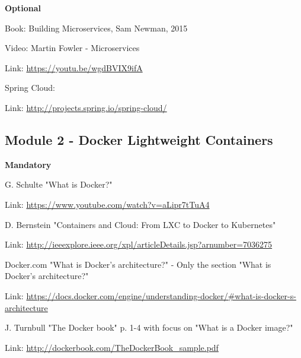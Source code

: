 \noindent\textbf{Optional}
\begin{compactitem}	
\setlength\itemsep{0.05em}
  \item Book: Building Microservices, Sam Newman, 2015

  \item Video: Martin Fowler - Microservices
  \begin{compactitem}
  	\item Link: \url{https://youtu.be/wgdBVIX9ifA}
  \end{compactitem}
 
  \item Spring Cloud:
  \begin{compactitem}
  	\item Link: \url{http://projects.spring.io/spring-cloud/}
  \end{compactitem}
\end{compactitem}


\subsection*{Module 2 - Docker Lightweight Containers}

\textbf{Mandatory}
\begin{compactitem}	
\setlength\itemsep{0.05em}
  \item G. Schulte "What is Docker?"
  \begin{compactitem}
  	\item Link: \url{https://www.youtube.com/watch?v=aLipr7tTuA4 } 
  \end{compactitem}
  
  \item D. Bernstein "Containers and Cloud: From LXC to Docker to Kubernetes"
  \begin{compactitem}
  	\item Link: \url{http://ieeexplore.ieee.org/xpl/articleDetails.jsp?arnumber=7036275}
  \end{compactitem}
  
  \item Docker.com "What is Docker's architecture?" - Only the section "What is Docker’s architecture?"
  \begin{compactitem}
  	\item Link: \url{https://docs.docker.com/engine/understanding-docker/\#what-is-docker-s-architecture}
  \end{compactitem}
  
  \item  J. Turnbull "The Docker book" p. 1-4 with focus on "What is a Docker image?"
  \begin{compactitem}
  	\item Link: \url{http://dockerbook.com/TheDockerBook_sample.pdf}
  \end{compactitem}
\end{compactitem}

